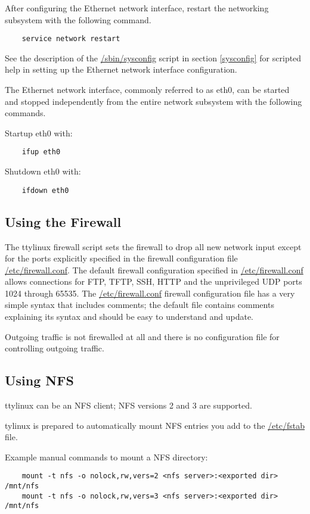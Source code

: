 \documentclass[10pt]{article}
\begin{document}
After configuring the Ethernet network interface, restart the networking
subsystem with the following command.

\begin{lstlisting}
	service network restart
\end{lstlisting}

See the description of the \url{/sbin/sysconfig} script in section
\ref{sysconfig} for scripted help in setting up the Ethernet network interface
configuration.

The Ethernet network interface, commonly referred to as eth0, can be started
and stopped independently from the entire network subsystem with the following
commands.

Startup eth0 with:
\begin{lstlisting}
	ifup eth0
\end{lstlisting}

Shutdown eth0 with:
\begin{lstlisting}
	ifdown eth0
\end{lstlisting}

\subsection{Using the Firewall}
\label{firewaller}

The ttylinux firewall script sets the firewall to drop all new network input
except for the ports explicitly specified in the firewall configuration file
\url{/etc/firewall.conf}. The default firewall configuration specified in
\url{/etc/firewall.conf} allows connections for FTP, TFTP, SSH, HTTP and the
unprivileged UDP ports 1024 through 65535. The \url{/etc/firewall.conf}
firewall configuration file has a very simple syntax that includes comments;
the default file contains comments explaining its syntax and should be easy to
understand and update.

Outgoing traffic is not firewalled at all and there is no configuration file
for controlling outgoing traffic.

\subsection{Using NFS}

ttylinux can be an NFS client; NFS versions 2 and 3 are supported.

tylinux is prepared to automatically mount NFS entries you add to the
\url{/etc/fstab} file.

Example manual commands to mount a NFS directory:
\begin{lstlisting}
	mount -t nfs -o nolock,rw,vers=2 <nfs server>:<exported dir> /mnt/nfs
	mount -t nfs -o nolock,rw,vers=3 <nfs server>:<exported dir> /mnt/nfs
\end{lstlisting}
\end{document}
